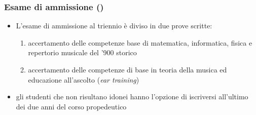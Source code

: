 %
%
%

\setcounter{ms}{0}
\begin{frame}
    \frametitle<+->{Esame di ammissione ()}

	\begin{itemize}[<+- | alert@+->]

		\item L'esame di ammissione al triennio è diviso in due prove scritte:

      \begin{enumerate}[<+- | alert@+->]

        \item accertamento delle competenze base di matematica,
        informatica, fisica e repertorio musicale del '900 storico


        \item accertamento delle competenze di base in teoria della musica ed
        educazione all'ascolto (\emph{ear training})

     \end{enumerate}

    \item gli studenti che non risultano idonei hanno l'opzione di iscriversi 
    all'ultimo dei due anni del corso propedeutico

	\end{itemize}

\end{frame}
